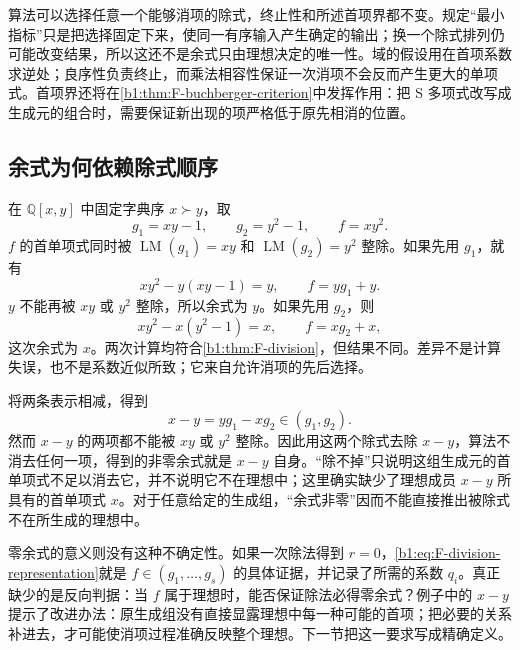 算法可以选择任意一个能够消项的除式，终止性和所述首项界都不变。规定“最小指标”只是把选择固定下来，使同一有序输入产生确定的输出；换一个除式排列仍可能改变结果，所以这还不是余式只由理想决定的唯一性。域的假设用在首项系数求逆处；良序性负责终止，而乘法相容性保证一次消项不会反而产生更大的单项式。首项界还将在\cref{b1:thm:F-buchberger-criterion}中发挥作用：把 S 多项式改写成生成元的组合时，需要保证新出现的项严格低于原先相消的位置。

\subsection{余式为何依赖除式顺序}
\label{b1:subsec:F01:03}

在 \(\mathbb Q[x,y]\) 中固定字典序 \(x\succ y\)，取
\[
	g_1=xy-1,\qquad g_2=y^2-1,\qquad f=xy^2.
\]
\(f\) 的首单项式同时被 \(\operatorname{LM}(g_1)=xy\) 和 \(\operatorname{LM}(g_2)=y^2\) 整除。如果先用 \(g_1\)，就有
\[
	xy^2-y(xy-1)=y, \qquad f=yg_1+y.
\]
\(y\) 不能再被 \(xy\) 或 \(y^2\) 整除，所以余式为 \(y\)。如果先用 \(g_2\)，则
\[
	xy^2-x(y^2-1)=x, \qquad f=xg_2+x,
\]
这次余式为 \(x\)。两次计算均符合\cref{b1:thm:F-division}，但结果不同。差异不是计算失误，也不是系数近似所致；它来自允许消项的先后选择。

\ProseParagraphBreak
将两条表示相减，得到
\begin{equation}\label{b1:eq:F-missing-generator}
	x-y=yg_1-xg_2\in(g_1,g_2).
\end{equation}
然而 \(x-y\) 的两项都不能被 \(xy\) 或 \(y^2\) 整除。因此用这两个除式去除 \(x-y\)，算法不消去任何一项，得到的非零余式就是 \(x-y\) 自身。“除不掉”只说明这组生成元的首单项式不足以消去它，并不说明它不在理想中；这里确实缺少了理想成员 \(x-y\) 所具有的首单项式 \(x\)。对于任意给定的生成组，“余式非零”因而不能直接推出被除式不在所生成的理想中。

\ProseParagraphBreak
零余式的意义则没有这种不确定性。如果一次除法得到 \(r=0\)，\eqref{b1:eq:F-division-representation}就是 \(f\in(g_1,\ldots,g_s)\) 的具体证据，并记录了所需的系数 \(q_i\)。真正缺少的是反向判据：当 \(f\) 属于理想时，能否保证除法必得零余式？例子中的 \(x-y\) 提示了改进办法：原生成组没有直接显露理想中每一种可能的首项；把必要的关系补进去，才可能使消项过程准确反映整个理想。下一节把这一要求写成精确定义。
